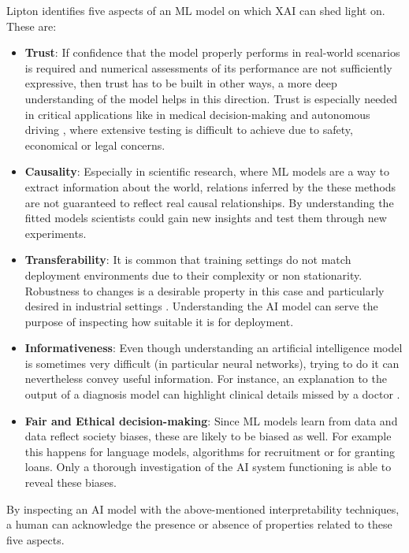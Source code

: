 Lipton \cite{Lipton} identifies five aspects of an ML model on which XAI can shed light on.
These are:
\begin{itemize}
\item{\textbf{Trust}: If confidence that the model properly performs in real-world scenarios is 
required and numerical assessments of its performance are not sufficiently 
expressive, then trust has to be built in other ways, a more deep understanding of 
the model helps in this direction. Trust is especially needed in critical applications 
like in medical decision-making \cite{XAI_healthcare} and autonomous driving \cite{Zablocki2022}, where extensive 
testing is difficult to achieve due to safety, economical or legal concerns.}
\item{\textbf{Causality}:
Especially in scientific research, where ML models are a way to extract information about the world, relations inferred by the these methods are not guaranteed to reflect real causal relationships.
By understanding the fitted models scientists could gain new insights and test them through new experiments.
}
\item{\textbf{Transferability}:
It is common that training settings do not match deployment environments due to their complexity or non stationarity.
Robustness to changes is a desirable property in this case and particularly desired in industrial settings \cite{XAI_industry}. 
Understanding the AI model can serve the purpose of inspecting how suitable it is for deployment.
}
\item{\textbf{Informativeness}:
Even though understanding an artificial intelligence model is sometimes very difficult (in particular neural networks), trying to do it can nevertheless convey useful information.
For instance, an explanation to the output of a diagnosis model can highlight clinical details missed by a doctor \cite{XAI_healthcare}.
}
\item{\textbf{Fair and Ethical decision-making}:
Since ML models learn from data and data reflect society biases, these are likely to be biased as well.
For example this happens for language models, algorithms for recruitment or for granting loans. 
Only a thorough investigation of the AI system functioning is able to reveal these biases.
}
\end{itemize}
By inspecting an AI model with the above-mentioned interpretability techniques, a human can acknowledge the presence or absence of properties related to these five aspects.

